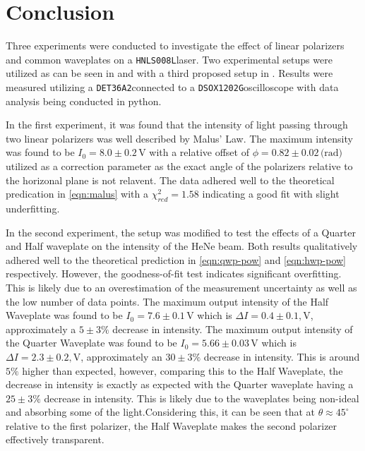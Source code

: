 \documentclass[aip, cp, amsmath, amssymb, reprint]{revtex4-2}
\newcommand{\oscope}{\texttt{DSOX1202G}\space}
\newcommand{\pdiode}{\texttt{DET36A2}\space}
\newcommand{\hene}{\texttt{HNLS008L}\space}
\begin{document}
    \section{Conclusion}
        
        Three experiments were conducted to investigate the effect of linear polarizers and common waveplates on a \hene laser. Two experimental setups were utilized as can be seen in  and  with a third proposed setup in . Results were measured utilizing a \pdiode connected to a \oscope oscilloscope with data analysis being conducted in python\cite{python}.

        In the first experiment, it was found that the intensity of light passing through two linear polarizers was well described by Malus' Law. The maximum intensity was found to be $I_0 = 8.0 \pm 0.2\,\text{V}$ with a relative offset of $\phi = 0.82 \pm 0.02\,\text{(rad)}$ utilized as a correction parameter as the exact angle of the polarizers relative to the horizonal plane is not relavent. The data adhered well to the theoretical predication in \eqref{eqn:malus} with a $\chi_{red}^2 = 1.58$ indicating a good fit with slight underfitting. 

        In the second experiment, the setup was modified to test the effects of a Quarter and Half waveplate on the intensity of the HeNe beam. Both results qualitatively adhered well to the theoretical prediction in \eqref{eqn:qwp-pow} and \eqref{eqn:hwp-pow} respectively. However, the goodness-of-fit test indicates significant overfitting. This is likely due to an overestimation of the measurement uncertainty as well as the low number of data points. The maximum output intensity of the Half Waveplate was found to be $I_0 = 7.6 \pm 0.1\,\text{V}$ which is $\Delta I = 0.4\pm0.1,\text{V}$, approximately a $5\pm3\%$ decrease in intensity. The maximum output intensity of the Quarter Waveplate was found to be $I_0 = 5.66 \pm 0.03\,\text{V}$ which is $\Delta I = 2.3\pm0.2,\text{V}$, approximately an $30\pm3\%$ decrease in intensity. This is around $5\%$ higher than expected, however, comparing this to the Half Waveplate, the decrease in intensity is exactly as expected with the Quarter waveplate having a $25\pm3\%$ decrease in intensity. This is likely due to the waveplates being non-ideal and absorbing some of the light.Considering this, it can be seen that at $\theta \approx 45^\circ$ relative to the first polarizer, the Half Waveplate makes the second polarizer effectively transparent. 
\end{document}
